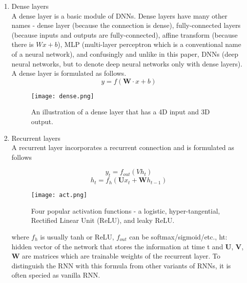 \documentclass[journal, a4paper]{IEEEtran}
\begin{document}
\begin{enumerate}
\item Dense layers\\
A dense layer is a basic module of DNNs. Dense layers have many other names - dense layer (because the connection is dense), fully-connected layers (because inputs and outputs are fully-connected), affine transform (because there is $Wx+b$), MLP (multi-layer perceptron which is a conventional name of a neural network), and confusingly and unlike in this paper, DNNs (deep neural networks, but to denote deep neural networks only with dense layers). A dense layer is formulated as follows.
$$y = f(\textbf{W} \cdot x + b)$$

	\begin{figure}[!hbt]
		\begin{center}
		\texttt{[image: dense.png]}
		\caption{An illustration of a dense layer that has a 4D input and 3D output.}
		\label{fig:conv}
		\end{center}
	\end{figure}

\item Recurrent layers\\
A recurrent layer incorporates a recurrent connection and is formulated as follows

$$y_t = f_{out}(Vh_t)$$
$$h_t = f_h(\textbf{U}x_t +\textbf{W}h_{t-1})$$

	\begin{figure}[!hbt]
		\begin{center}
		\texttt{[image: act.png]}
		\caption{Four popular activation functions - a logistic, hyper-tangential, Rectified Linear Unit (ReLU), and leaky ReLU.}
		\label{fig:rnn}
		\end{center}
	\end{figure}

where $f_h$ is usually tanh or ReLU, $f_{out}$ can be softmax/sigmoid/etc., ht: hidden vector of the network that stores the information at time t and \textbf{U}, \textbf{V}, \textbf{W} are matrices which are trainable weights of the recurrent layer. To distinguish the RNN with this formula from other variants of RNNs, it is often specied as vanilla RNN.


\end{enumerate}
\end{document}
